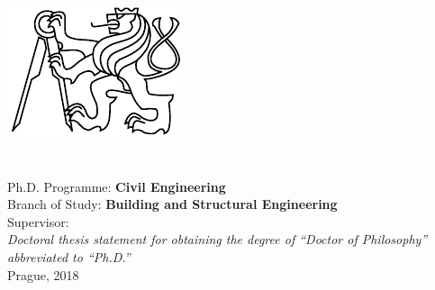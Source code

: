 \documentclass[
    11pt, %
    english, %
    singlespacing, %
    headsepline, %
    chapterinoneline, %
    decreaseabovechapterskip, %
    ]{MastersDoctoralThesis} %
\begin{document}
%
%
\begin{titlepage}
\begin{center}
{\Large\textsc{\univname}}\\[0.3cm]
{\large \facname}\\
\deptname\\[0.5cm]
\includegraphics[width=.24\textwidth]{figures/logo-cvut}\\[1cm]
{\Large\textsc{\authorname}}\\[1cm]
{\LARGE \bfseries \ttitle}\\[2cm]

\large
Ph.D. Programme: \textbf{Civil Engineering} \\
Branch of Study: \textbf{Building and Structural Engineering} \\[0.5cm]
Supervisor: \textbf{\supname} \\[3cm]

\vfill
\large \textit{Doctoral thesis statement for obtaining the degree of ``Doctor of Philosophy'' abbreviated to ``Ph.D.''}\\[2cm]
{\large Prague, 2018}\\[2cm]
\end{center}
\end{titlepage}

%
%

\end{document}
